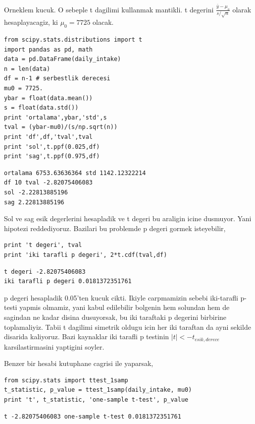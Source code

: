 \documentclass[12pt,fleqn]{article}\usepackage{../common}
\begin{document}
Orneklem kucuk. O sebeple t dagilimi kullanmak mantikli. t degerini
$\frac{\bar{y}-\mu_o}{s/\sqrt{n}}$ olarak hesaplayacagiz, ki $\mu_0=7725$ olacak.

\begin{verbatim}
from scipy.stats.distributions import t
import pandas as pd, math
data = pd.DataFrame(daily_intake)
n = len(data)
df = n-1 # serbestlik derecesi
mu0 = 7725.
ybar = float(data.mean())
s = float(data.std())
print 'ortalama',ybar,'std',s
tval = (ybar-mu0)/(s/np.sqrt(n))
print 'df',df,'tval',tval
print 'sol',t.ppf(0.025,df)
print 'sag',t.ppf(0.975,df)
\end{verbatim}

\begin{verbatim}
ortalama 6753.63636364 std 1142.12322214
df 10 tval -2.82075406083
sol -2.22813885196
sag 2.22813885196
\end{verbatim}

Sol ve sag esik degerlerini hesapladik ve t degeri bu araligin icine
dusmuyor. Yani hipotezi reddediyoruz. Bazilari bu problemde p degeri gormek
isteyebilir, 

\begin{verbatim}
print 't degeri', tval
print 'iki tarafli p degeri', 2*t.cdf(tval,df)
\end{verbatim}

\begin{verbatim}
t degeri -2.82075406083
iki tarafli p degeri 0.0181372351761
\end{verbatim}

p degeri hesapladik 0.05'ten kucuk cikti. Ikiyle carpmamizin sebebi
iki-tarafli p-testi yapmis olmamiz, yani kabul edilebilir bolgenin hem
solundan hem de sagindan ne kadar disina dusuyorsak, bu iki taraftaki p
degerini birbirine toplamaliyiz. Tabii t dagilimi simetrik oldugu icin her
iki taraftan da ayni sekilde disarida kaliyoruz. Bazi kaynaklar iki tarafli
p testinin $|t| < -t_{esik,derece}$ karsilastirmasini yaptigini soyler.

Benzer bir hesabi kutuphane cagrisi ile yaparsak,

\begin{verbatim}
from scipy.stats import ttest_1samp
t_statistic, p_value = ttest_1samp(daily_intake, mu0)
print 't', t_statistic, 'one-sample t-test', p_value
\end{verbatim}

\begin{verbatim}
t -2.82075406083 one-sample t-test 0.0181372351761
\end{verbatim}
\end{document}
